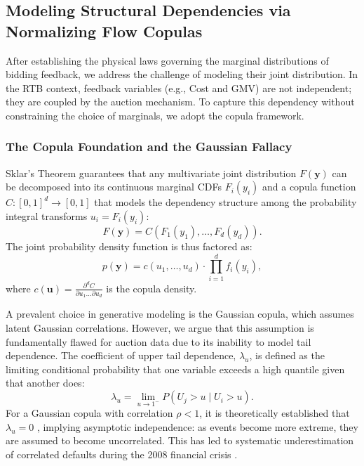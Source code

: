 \documentclass[sigconf, anonymous, review]{acmart}
\begin{document}
\subsection{Modeling Structural Dependencies via Normalizing Flow Copulas}
\label{ssec:joint_modeling}

After establishing the physical laws governing the marginal distributions of bidding feedback, we address the challenge of modeling their joint distribution. In the RTB context, feedback variables (e.g., Cost and GMV) are not independent; they are coupled by the auction mechanism. 
To capture this dependency without constraining the choice of marginals, we adopt the copula framework.

\subsubsection{The Copula Foundation and the Gaussian Fallacy}
Sklar's Theorem \cite{sklar1959fonctions} guarantees that any multivariate joint distribution $F(\mathbf{y})$ can be decomposed into its continuous marginal CDFs $F_i(y_i)$ and a copula function $C: [0, 1]^d \to [0, 1]$ that models the dependency structure among the probability integral transforms $u_i = F_i(y_i)$:
\begin{equation}
    F(\mathbf{y}) = C(F_1(y_1), \dots, F_d(y_d)).
\end{equation}
The joint probability density function is thus factored as:
\begin{equation}
    p(\mathbf{y}) = c(u_1, \dots, u_d) \cdot \prod_{i=1}^d f_i(y_i),
\end{equation}
where $c(\mathbf{u}) = \frac{\partial^d C}{\partial u_1 \dots \partial u_d}$ is the copula density.

A prevalent choice in generative modeling is the Gaussian copula, which assumes latent Gaussian correlations. 
However, we argue that this assumption is fundamentally flawed for auction data due to its inability to model tail dependence. 
The coefficient of upper tail dependence, $\lambda_u$, is defined as the limiting conditional probability that one variable exceeds a high quantile given that another does:
\begin{equation}
    \lambda_u = \lim_{u \to 1^-} P(U_j > u \mid U_i > u).
\end{equation}
For a Gaussian copula with correlation $\rho < 1$, it is theoretically established that $\lambda_u = 0$ \cite{mcneil2015quantitative}, implying asymptotic independence: as events become more extreme, they are assumed to become uncorrelated. This has led to systematic underestimation of correlated defaults during the 2008 financial crisis \cite{li2000default, salmon2009recipe}.
\end{document}
